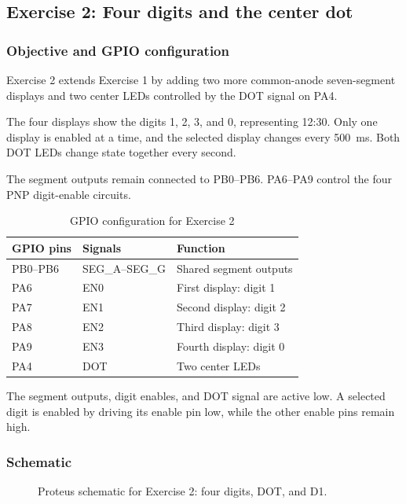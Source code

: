 \documentclass[a4paper]{article}
\begin{document}
\subsection{Exercise 2: Four digits and the center dot}

\subsubsection{Objective and GPIO configuration}

Exercise 2 extends Exercise 1 by adding two more
common-anode seven-segment displays and two center
LEDs controlled by the DOT signal on PA4.

The four displays show the digits 1, 2, 3, and 0,
representing 12:30. Only one display is enabled
at a time, and the selected display changes every
500~ms. Both DOT LEDs change state together
every second.

The segment outputs remain connected to PB0--PB6.
PA6--PA9 control the four PNP digit-enable circuits.

\begin{table}[H]
    \centering
    \caption{GPIO configuration for Exercise 2}
    \label{tab:ex02-gpio}
    \begin{tabular}{lll}
        \toprule
        \textbf{GPIO pins} &
        \textbf{Signals} &
        \textbf{Function} \\
        \midrule
        PB0--PB6 & SEG\_A--SEG\_G & Shared segment outputs \\
        PA6 & EN0 & First display: digit 1 \\
        PA7 & EN1 & Second display: digit 2 \\
        PA8 & EN2 & Third display: digit 3 \\
        PA9 & EN3 & Fourth display: digit 0 \\
        PA4 & DOT & Two center LEDs \\
        \bottomrule
    \end{tabular}
\end{table}

The segment outputs, digit enables, and DOT signal
are active low. A selected digit is enabled by
driving its enable pin low, while the other
enable pins remain high.

\subsubsection{Schematic}

\begin{figure}[H]
    \centering
    \caption{Proteus schematic for Exercise 2: four digits, DOT, and D1.}
    \label{fig:ex02}
\end{figure}
\end{document}
